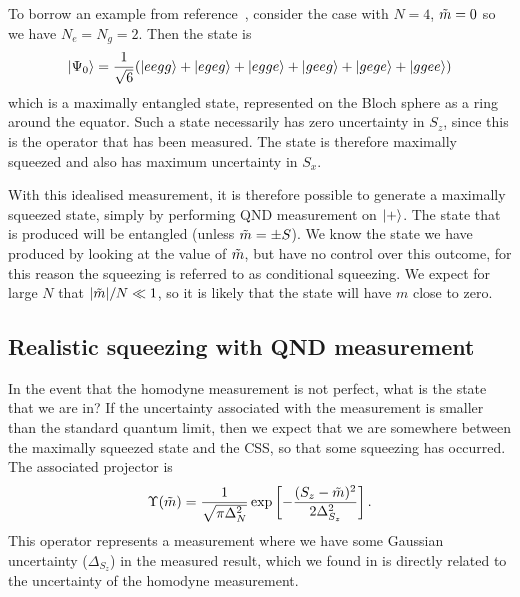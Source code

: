 To borrow an example from reference~\cite{Cox2016}, consider the case with
$N=4$, $\tilde{m}=0$ so we have $N_e = N_g = 2$. Then the state is
%
\begin{equation}
  \ket{\Psi_0} = \frac{1}{\sqrt{6}}(\ket{eegg} + \ket{egeg} + \ket{egge} +
  \ket{geeg} + \ket{gege} + \ket{ggee})
\end{equation}
%
which is a maximally entangled state, represented on the Bloch sphere as a ring
around the equator.
%
Such a state necessarily has zero uncertainty in $S_z$, since this is the
operator that has been measured. The state is therefore maximally squeezed and also
has maximum uncertainty in $S_x$.

With this idealised measurement, it is therefore possible to generate a maximally
squeezed state, simply by performing QND measurement on $\ket{+}$. The state
that is produced will be entangled (unless $\tilde{m} = \pm S$). We know the
state we have produced by looking at the value of $\tilde{m}$, but have no
control over this outcome, for this reason the squeezing is referred to as
conditional squeezing.
%
We expect for large $N$ that $|\tilde{m}|/N \ll 1$, so it is likely that the
state will have $m$ close to zero.

\subsection{Realistic squeezing with QND measurement}

In the event that the homodyne measurement is not perfect, what is the state
that we are in? If the uncertainty associated with the measurement is smaller
than the standard quantum limit, then we expect that we are somewhere between
the maximally squeezed state and the CSS, so that some squeezing has
occurred.
%
The associated projector is~\cite{MAURODARIANO2003205, Vanner16182, Cox2016}
%
\begin{equation}
  \Upsilon(\tilde{m}) = \frac{1}{\sqrt{\pi\Delta_N^2}}\exp\left[
    -\frac{(S_z-\tilde{m})^2}{2\Delta_{S_z}^2}\right].
\end{equation}
%
This operator represents a measurement where we have some Gaussian uncertainty
($\Delta_{S_z}$) in the measured result, which we found in
 is directly related to the uncertainty of the
homodyne measurement.

